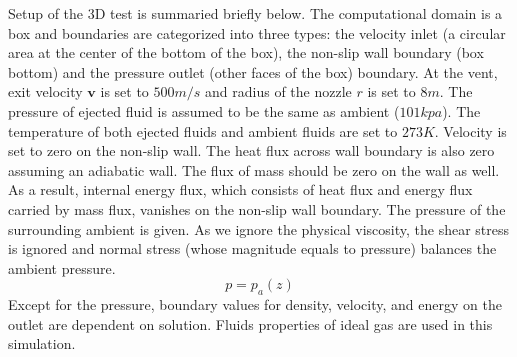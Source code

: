\documentclass[review]{elsarticle}
\begin{document}
Setup of the 3D test is summaried briefly below. The computational domain is a box and boundaries are categorized into three types: the velocity inlet (a circular area at the center of the bottom of the box), the non-slip wall boundary (box bottom) and the pressure outlet (other faces of the box) boundary. At the vent, exit velocity $\textbf{v}$ is set to $500 m / s$ and radius of the nozzle $r$ is set to $8m $. The pressure of ejected fluid is assumed to be the same as ambient ($101 kpa$). The temperature of both ejected fluids and ambient fluids are set to $273 K$. 
Velocity is set to zero on the non-slip wall. The heat flux across wall boundary is also zero assuming an adiabatic wall. The flux of mass should be zero on the wall as well. As a result, internal energy flux, which consists of heat flux and energy flux carried by mass flux, vanishes on the non-slip wall boundary. 
The pressure of the surrounding ambient is given. As we ignore the physical viscosity, the shear stress is ignored and normal stress (whose magnitude equals to pressure) balances the ambient pressure.
\begin{equation}
p = p_a\left(z\right)  \label{eq:pressure_bc_p} 
\end{equation} 
Except for the pressure, boundary values for density, velocity, and energy on the outlet are dependent on solution. Fluids properties of ideal gas are used in this simulation.
\end{document}

